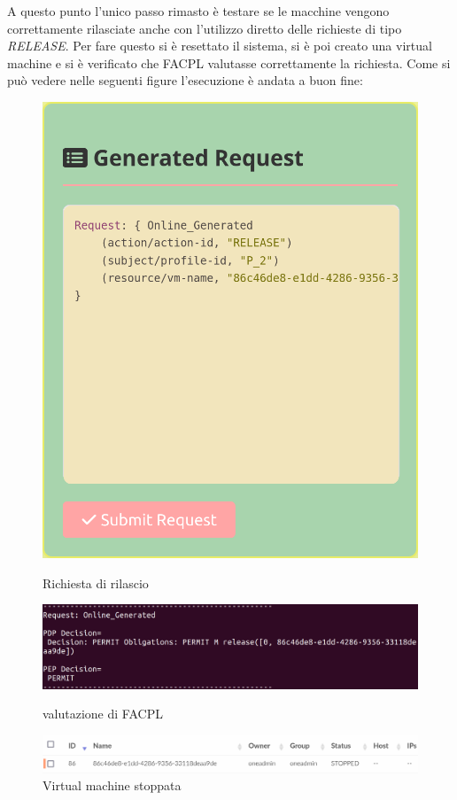 A questo punto l'unico passo rimasto è testare se le macchine vengono correttamente rilasciate anche con l'utilizzo diretto delle richieste di tipo \emph{RELEASE}. Per fare questo si è resettato il sistema, si è poi creato una virtual machine e si è verificato che FACPL valutasse correttamente la richiesta. Come si può vedere nelle seguenti figure l'esecuzione è andata a buon fine:
\begin{figure}[H]
    \centering
    \begin{minipage}{0.40\textwidth}
        \centering
        \includegraphics[width=\textwidth]{tesi_screenshot/ReleaseP2.png}
        \caption{Richiesta di rilascio}
    \end{minipage}
    \begin{minipage}{0.59\textwidth}
        \centering
        \includegraphics[width=\textwidth]{tesi_screenshot/permitRelease.png}
        \caption{valutazione di FACPL}
    \end{minipage}
    \par \medbreak
    \begin{minipage}{\textwidth}
        \centering
        \includegraphics[width=\textwidth]{tesi_screenshot/stoppedVM.png}
        \caption{Virtual machine stoppata}
    \end{minipage}
\end{figure}